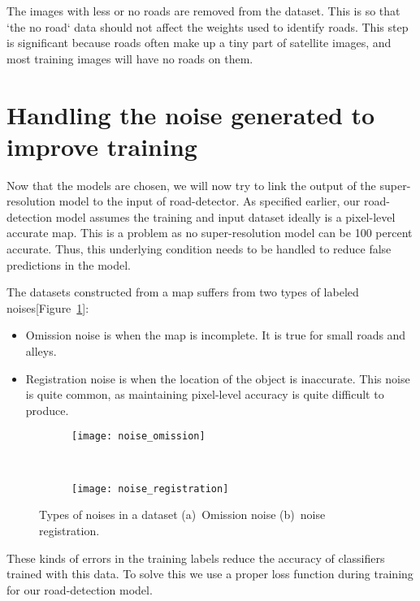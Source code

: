 The images with less or no roads are removed from the dataset. This is so that `the no road` data should not affect the weights used to identify roads. This step is significant because roads often make up a tiny part of satellite images, and most training images will have no roads on them.


\section{Handling the noise generated to improve training}
Now that the models are chosen, we will now try to link the output of the super-resolution model to the input of road-detector. As specified earlier, our road-detection model assumes the training and input dataset ideally is a pixel-level accurate map. This is a problem as no super-resolution model can be 100 percent accurate. Thus, this underlying condition needs to be handled to reduce false predictions in the model.

The datasets constructed from a map suffers from two types of labeled noises[Figure~\ref{fig:noise_types}]:
\begin{itemize}
  \item Omission noise is when the map is incomplete. It is true for small roads and alleys.
  \item Registration noise is when the location of the object is inaccurate. This noise is quite common, as maintaining pixel-level accuracy is quite difficult to produce.
\end{itemize}

\begin{figure}[h!]
  \centering
  \begin{subfigure}{0.63\textwidth}
    \texttt{[image: noise\_omission]}
    \caption{}
  \end{subfigure}~
  \begin{subfigure}{0.35\textwidth}
    \texttt{[image: noise\_registration]}
    \caption{}
  \end{subfigure}
  \caption[Types of noises in a dataset]{Types of noises in a dataset (a)~Omission noise (b)~noise registration.}
  \label{fig:noise_types}
\end{figure}

These kinds of errors in the training labels reduce the accuracy of classifiers trained with this data. To solve this we use a proper loss function during training for our road-detection model.
